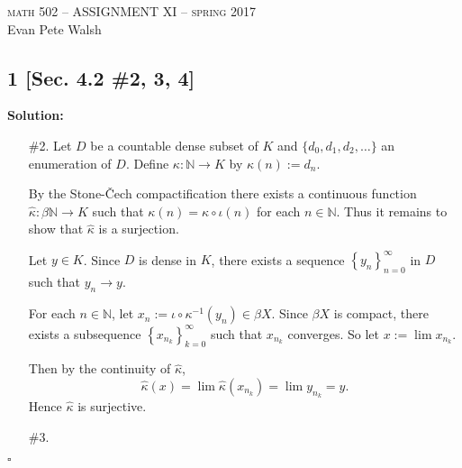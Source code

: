 \documentclass[12pt]{article}
\newcounter{ProofCounter}
\newcounter{ClaimCounter}[ProofCounter]
\newenvironment{Solution}{\stepcounter{ProofCounter}\textbf{Solution:}}{\hfill$\square$}
\newenvironment{claim}[1]{\vspace{1mm}\stepcounter{ClaimCounter}\par\noindent\underline{\bf Claim \theClaimCounter:}\space#1}{}
\newenvironment{claimproof}[1]{\par\noindent\underline{Proof of claim \theClaimCounter:}\space#1}{\hfill $\blacksquare$ Claim \theClaimCounter}
\begin{document}
\thispagestyle{empty}
\begin{center}
  \Large \textsc{math 502 -- ASSIGNMENT XI -- spring 2017} \\ 
  \vspace{5mm}
  \large Evan Pete Walsh
\end{center}


\subsection*{1 [Sec. 4.2 \#2, 3, 4]}
\begin{Solution}
  \begin{enumerate}
    \item[\#2.] Let $D$ be a countable dense subset of $K$ and $\{d_0, d_1, d_2, \dots\}$ an enumeration of $D$. Define $\kappa : \mathbb{N}
      \rightarrow K$ by $\kappa(n) := d_{n}$.

      By the Stone-\v{C}ech compactification there exists a continuous function $\hat{\kappa} : \beta \mathbb{N} \rightarrow K$ such that $\kappa(n) =
      \hat{\kappa}\circ \iota(n)$ for each $n \in \mathbb{N}$. Thus it remains to show that $\hat{\kappa}$ is a surjection.

      Let $y \in K$. Since $D$ is dense in $K$, there exists a sequence $\left\{ y_n \right\}_{n=0}^{\infty}$ in $D$ such that $y_n \rightarrow y$.

      For each $n \in \mathbb{N}$, let $x_n := \iota \circ \kappa^{-1}(y_n) \in \beta X$. Since $\beta X$ is compact, there exists a subsequence $\left\{
      x_{n_k} \right\}_{k=0}^{\infty}$ such that $x_{n_k}$ converges. So let $x := \lim x_{n_k}$.

      Then by the continuity of $\hat{\kappa}$,
      \[
        \hat{\kappa}(x) = \lim \hat{\kappa}(x_{n_k}) = \lim y_{n_k} = y.
      \]
      Hence $\hat{\kappa}$ is surjective.

    \item[\#3.]
\end{enumerate}
\end{Solution}
\end{document}
